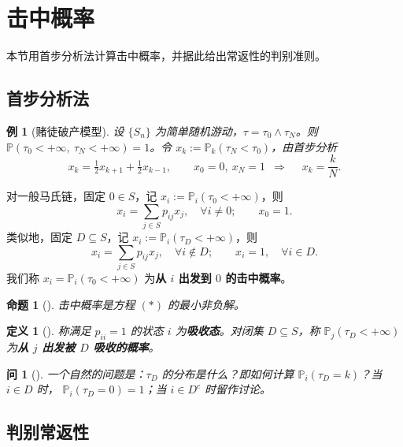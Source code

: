 \documentclass[lang=cn,10pt,newtx,thmcnt=chapter,mode=simple]{vividbook}
\providecommand{\Pp}{}\renewcommand{\Pp}{\mathbb{P}}
\newcommand{\darr}{\;\Rightarrow\;}
\theoremstyle{vividthm}
\newtheorem*{vividproposition}{命题}
\theoremstyle{vividdef}
\newtheorem*{vividdefinition}{定义}
\theoremstyle{vividexa}
\newtheorem*{vividexample}{例}
\theoremstyle{vividrem}
\newtheorem*{vividquestion}{问}
\renewenvironment{proposition}[1][]{\begin{vividproposition}[#1]}{\end{vividproposition}}
\renewenvironment{definition}[1][]{\begin{vividdefinition}[#1]}{\end{vividdefinition}}
\newenvironment{example}[1][]{\begin{vividexample}[#1]}{\end{vividexample}}
\newenvironment{question}[1][]{\begin{vividquestion}[#1]}{\end{vividquestion}}
\begin{document}
\section{击中概率}

本节用首步分析法计算击中概率，并据此给出常返性的判别准则。

\subsection{首步分析法}

\begin{example}[赌徒破产模型]
设 $\{S_n\}$ 为简单随机游动，$\tau=\tau_0\wedge\tau_N$。则 $\Pp(\tau_0<+\infty,\ \tau_N<+\infty)=1$。令
$x_k:=\Pp_k(\tau_N<\tau_0)$，由首步分析
\[
x_k=\tfrac12x_{k+1}+\tfrac12x_{k-1},
\qquad x_0=0,\ x_N=1
\ \darr\quad x_k=\frac{k}{N}.
\]
\end{example}

对一般马氏链，固定 $0\in S$，记 $x_i:=\Pp_i(\tau_0<+\infty)$，则
\begin{equation}
x_i=\sum_{j\in S}p_{ij}x_j,\quad\forall i\ne0;
\qquad x_0=1.
\tag{$\ast$}
\end{equation}
类似地，固定 $D\subseteq S$，记 $x_i:=\Pp_i(\tau_D<+\infty)$，则
\begin{equation}
x_i=\sum_{j\in S}p_{ij}x_j,\quad\forall i\notin D;
\qquad x_i=1,\quad\forall i\in D.
\tag{$\ast$}
\end{equation}
我们称 $x_i=\Pp_i(\tau_0<+\infty)$ 为\textbf{从 $i$ 出发到 $0$ 的击中概率}。

\begin{proposition}
击中概率是方程 $(\ast)$ 的最小非负解。
\end{proposition}

\begin{definition}
称满足 $p_{ii}=1$ 的状态 $i$ 为\textbf{吸收态}。对闭集 $D\subseteq S$，称 $\Pp_j(\tau_D<+\infty)$ 为\textbf{从 $j$ 出发被 $D$ 吸收的概率}。
\end{definition}

\begin{question}
一个自然的问题是：$\tau_D$ 的分布是什么？即如何计算 $\Pp_i(\tau_D=k)$？当 $i\in D$ 时，
$\Pp_i(\tau_D=0)=1$；当 $i\in D^c$ 时留作讨论。
\end{question}

\subsection{判别常返性}
\end{document}
